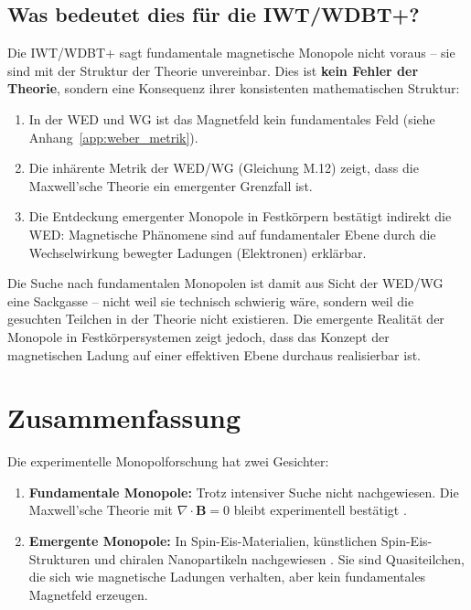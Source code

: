 \subsection{Was bedeutet dies für die IWT/WDBT+?}
\label{app:monopolforschung_bedeutung}

Die IWT/WDBT+ sagt fundamentale magnetische Monopole nicht voraus – sie sind mit der Struktur der Theorie unvereinbar. Dies ist \textbf{kein Fehler der Theorie}, sondern eine Konsequenz ihrer konsistenten mathematischen Struktur:

\begin{enumerate}
    \item In der WED und WG ist das Magnetfeld kein fundamentales Feld (siehe Anhang~\ref{app:weber_metrik}).
    \item Die inhärente Metrik der WED/WG (Gleichung M.12) zeigt, dass die Maxwell'sche Theorie ein emergenter Grenzfall ist.
    \item Die Entdeckung emergenter Monopole in Festkörpern bestätigt indirekt die WED: Magnetische Phänomene sind auf fundamentaler Ebene durch die Wechselwirkung bewegter Ladungen (Elektronen) erklärbar.
\end{enumerate}

Die Suche nach fundamentalen Monopolen ist damit aus Sicht der WED/WG eine Sackgasse – nicht weil sie technisch schwierig wäre, sondern weil die gesuchten Teilchen in der Theorie nicht existieren. Die emergente Realität der Monopole in Festkörpersystemen zeigt jedoch, dass das Konzept der magnetischen Ladung auf einer effektiven Ebene durchaus realisierbar ist.

\section{Zusammenfassung}
\label{app:monopolforschung_zusammenfassung}

Die experimentelle Monopolforschung hat zwei Gesichter:

\begin{enumerate}
    \item \textbf{Fundamentale Monopole:} Trotz intensiver Suche nicht nachgewiesen. Die Maxwell'sche Theorie mit $\nabla \cdot \mathbf{B} = 0$ bleibt experimentell bestätigt \cite{Maxwell1873}.
    
    \item \textbf{Emergente Monopole:} In Spin-Eis-Materialien, künstlichen Spin-Eis-Strukturen und chiralen Nanopartikeln nachgewiesen \cite{Castelnovo2008, Ladak2010, Mengotti2011, Small2024}. Sie sind Quasiteilchen, die sich wie magnetische Ladungen verhalten, aber kein fundamentales Magnetfeld erzeugen.
\end{enumerate}

